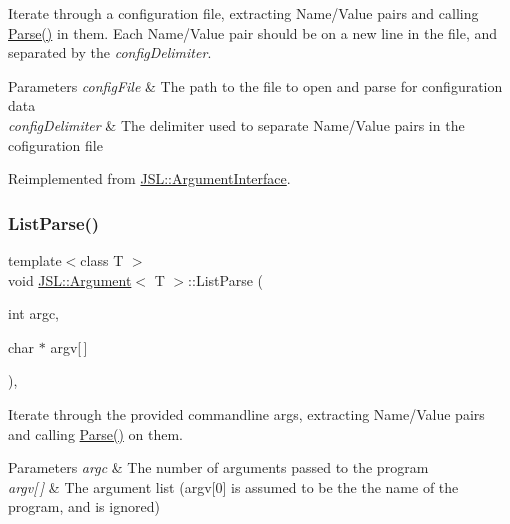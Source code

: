 Iterate through a configuration file, extracting Name/\+Value pairs and calling \hyperlink{classJSL_1_1Argument_a8984e7ce23155259d90a3e98170f36e0}{Parse()} in them. Each Name/\+Value pair should be on a new line in the file, and separated by the {\itshape config\+Delimiter}. 


\begin{DoxyParams}{Parameters}
{\em config\+File} & The path to the file to open and parse for configuration data \\
\hline
{\em config\+Delimiter} & The delimiter used to separate Name/\+Value pairs in the cofiguration file \\
\hline
\end{DoxyParams}


Reimplemented from \hyperlink{classJSL_1_1ArgumentInterface_aac7c3106f99c407e625b9bc6a6c8c446}{J\+S\+L\+::\+Argument\+Interface}.

\mbox{\label{classJSL_1_1Argument_aa2b18bb35e90f91e224a06d60835053a}} 
\subsubsection{\texorpdfstring{List\+Parse()}{ListParse()}}
{\footnotesize\ttfamily template$<$class T $>$ \\
void \hyperlink{classJSL_1_1Argument}{J\+S\+L\+::\+Argument}$<$ T $>$\+::List\+Parse (\begin{DoxyParamCaption}\item[{int}]{argc,  }\item[{char $\ast$}]{argv\mbox{[}$\,$\mbox{]} }\end{DoxyParamCaption})\hspace{0.3cm}{\ttfamily [inline]}, {\ttfamily [virtual]}}



Iterate through the provided commandline args, extracting Name/\+Value pairs and calling \hyperlink{classJSL_1_1Argument_a8984e7ce23155259d90a3e98170f36e0}{Parse()} on them. 


\begin{DoxyParams}{Parameters}
{\em argc} & The number of arguments passed to the program \\
\hline
{\em argv\mbox{[}$\,$\mbox{]}} & The argument list (argv\mbox{[}0\mbox{]} is assumed to be the the name of the program, and is ignored) \\
\hline
\end{DoxyParams}


